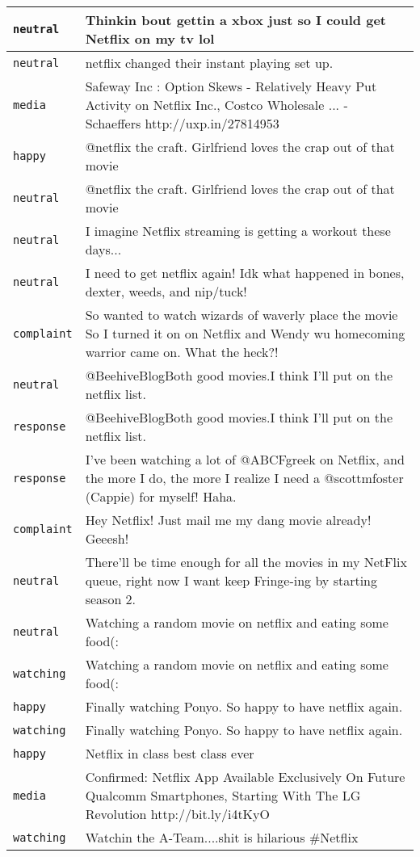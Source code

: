 {\begin{longtable}{|l|p{160mm}|}
      \tabularnewline\hline
         \texttt{neutral} & Thinkin bout gettin a xbox just so I could get Netflix on my tv lol
      \tabularnewline\hline
         \texttt{neutral} & netflix changed their instant playing set up.
      \tabularnewline\hline
         \texttt{media} & Safeway Inc : Option Skews - Relatively Heavy Put Activity on Netflix Inc., Costco Wholesale ... - Schaeffers http://uxp.in/27814953
      \tabularnewline\hline
         \texttt{happy} & @netflix the craft. Girlfriend loves the crap out of that movie
      \tabularnewline\hline
         \texttt{neutral} & @netflix the craft. Girlfriend loves the crap out of that movie
      \tabularnewline\hline
         \texttt{neutral} & I imagine Netflix streaming is getting a workout these days...
      \tabularnewline\hline
         \texttt{neutral} & I need to get netflix again! Idk what happened in bones, dexter, weeds, and nip/tuck!
      \tabularnewline\hline
         \texttt{complaint} & So wanted to watch wizards of waverly place the movie So I turned it on on Netflix and Wendy wu homecoming warrior came on. What the heck?!
      \tabularnewline\hline
         \texttt{neutral} & @BeehiveBlogBoth good movies.I think I'll put on the netflix list.
      \tabularnewline\hline
         \texttt{response} & @BeehiveBlogBoth good movies.I think I'll put on the netflix list.
      \tabularnewline\hline
         \texttt{response} & I've been watching a lot of @ABCFgreek on Netflix, and the more I do, the more I realize I need a @scottmfoster (Cappie) for myself! Haha.
      \tabularnewline\hline
         \texttt{complaint} & Hey Netflix! Just mail me my dang movie already! Geeesh!
      \tabularnewline\hline
         \texttt{neutral} & There'll be time enough for all the movies in my NetFlix queue, right now I want keep Fringe-ing by starting season 2.
      \tabularnewline\hline
         \texttt{neutral} & Watching a random movie on netflix and eating some food(:
      \tabularnewline\hline
         \texttt{watching} & Watching a random movie on netflix and eating some food(:
      \tabularnewline\hline
         \texttt{happy} & Finally watching Ponyo. So happy to have netflix again.
      \tabularnewline\hline
         \texttt{watching} & Finally watching Ponyo. So happy to have netflix again.
      \tabularnewline\hline
         \texttt{happy} & Netflix in class best class ever
      \tabularnewline\hline
         \texttt{media} & Confirmed: Netflix App Available Exclusively On Future Qualcomm Smartphones, Starting With The LG Revolution http://bit.ly/i4tKyO
      \tabularnewline\hline
         \texttt{watching} & Watchin the A-Team....shit is hilarious \#Netflix

\end{longtable}}

